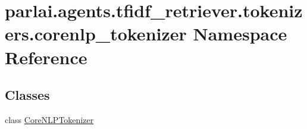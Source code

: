 \hypertarget{namespaceparlai_1_1agents_1_1tfidf__retriever_1_1tokenizers_1_1corenlp__tokenizer}{}\section{parlai.\+agents.\+tfidf\+\_\+retriever.\+tokenizers.\+corenlp\+\_\+tokenizer Namespace Reference}
\label{namespaceparlai_1_1agents_1_1tfidf__retriever_1_1tokenizers_1_1corenlp__tokenizer}
\subsection*{Classes}
\begin{DoxyCompactItemize}
\item 
class \hyperlink{classparlai_1_1agents_1_1tfidf__retriever_1_1tokenizers_1_1corenlp__tokenizer_1_1CoreNLPTokenizer}{Core\+N\+L\+P\+Tokenizer}
\end{DoxyCompactItemize}
